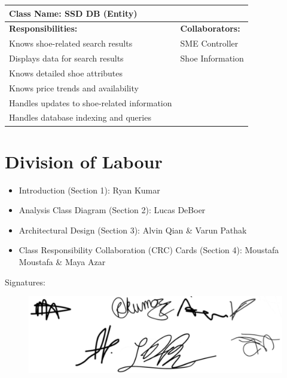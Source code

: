 \documentclass[]{article}
\begin{document}
\begin{table}[H]
    \centering
    \begin{tabular}{|p{}|p{}|}
        \hline
        \multicolumn{2}{|l|}{\textbf{Class Name:} SSD DB (Entity)} \\
        \hline
        \textbf{Responsibilities:} & \textbf{Collaborators:} \\
        \hline
        Knows shoe-related search results & SME Controller \\
        Displays data for search results & Shoe Information \\
        Knows detailed shoe attributes & \\  
        Knows price trends and availability & \\  
        Handles updates to shoe-related information & \\   
        Handles database indexing and queries & \\  
        \hline
    \end{tabular}
    \label{tab:ssd_db}
\end{table}

\appendix
\section{Division of Labour}
\label{sec:division_of_labour}

\begin{itemize}
    \item Introduction (Section 1): Ryan Kumar
    \item Analysis Class Diagram (Section 2): Lucas DeBoer 
    \item Architectural Design (Section 3): Alvin Qian \& Varun Pathak
    \item Class Responsibility Collaboration (CRC) Cards (Section 4): Moustafa Moustafa \& Maya Azar
\end{itemize}

Signatures:
\begin{figure}[H]
	\centering
	\includegraphics[width = \textwidth]{Signatures.png}
\end{figure}
\end{document}
